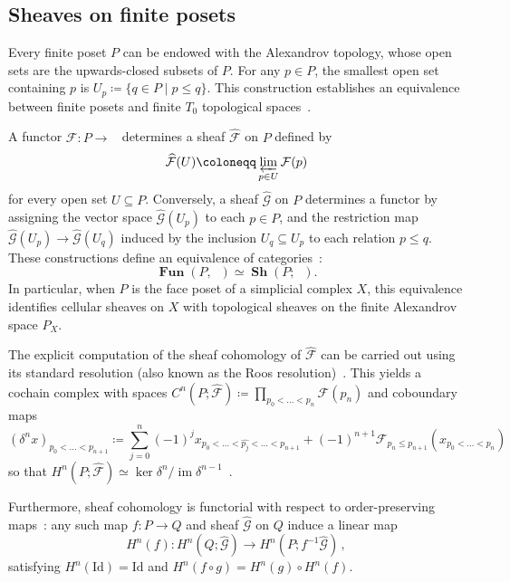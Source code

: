 \documentclass[reqno,12pt]{amsart}
\newcommand{\cF}{{\mathcal F}}
\newcommand{\cG}{{\mathcal G}}
\DeclareMathOperator{\Sh}{\mathbf{Sh}}
\DeclareMathOperator{\Fun}{\mathbf{Fun}}
\DeclareMathOperator{\vect}{\mathbf{vect}_\Bbbk}
\DeclareMathOperator{\img}{im}
\newcommand{\0}{\mathbf 0}
\theoremstyle{definition}
\begin{document}
\subsection{Sheaves on finite posets}
\label{Sec:HacesPosets}
Every finite poset $P$ can be endowed with the Alexandrov topology, whose open sets are the upwards-closed subsets of $P$. For any $p\in P$, the smallest open set containing $p$ is $U_p\coloneqq \{q\in P \mid p\leq q\}$. This construction establishes an equivalence between finite posets and finite $T_0$ topological spaces~\cite{Barmak11}. 

A functor $\cF\colon P\to\vect$ determines a sheaf $\widehat{\cF}$ on $P$ defined by
\[
    \widehat{\cF}(U) \coloneqq \varprojlim_{p\in U}\cF(p)
\]
for every open set $U\subseteq P$. Conversely, a sheaf $\widehat{\cG}$ on $P$ determines a functor by assigning the vector space $\widehat{\cG}(U_p)$ to each $p \in P$, and the restriction map $\widehat{\cG}(U_p) \to \widehat{\cG}(U_q)$ induced by the inclusion $U_q \subseteq U_p$ to each relation $p \leq q$. These constructions define an equivalence of categories~\cite[Theorem~4.2.10]{Curry14}: 
\[
    \Fun(P,\vect)\simeq \Sh(P;\vect).
\]
In particular, when $P$ is the face poset of a simplicial complex $X$, this equivalence identifies cellular sheaves on $X$ with topological sheaves on the finite Alexandrov space $P_X$.

The explicit computation of the sheaf cohomology of $\widehat{\cF}$ can be carried out using its standard resolution (also known as the Roos resolution)~\cite{Fernando_17}. This yields a cochain complex with spaces $C^n(P;\widehat{\mathcal{F}}) \coloneqq \prod_{p_0<\dots<p_n}\mathcal{F}(p_n)$ and coboundary maps 
\begin{equation}\label{Eq:CoboundaryStandardResolution}
    (\delta^n x)_{p_0<\dots<p_{n+1}} \coloneqq \sum_{j=0}^{n} (-1)^j x_{p_0<\dots<\widehat{p_j}<\dots<p_{n+1}} + (-1)^{n+1} \mathcal{F}_{p_n\leq p_{n+1}} (x_{p_0<\dots<p_n})
\end{equation}
so that $H^n(P;\widehat{\cF})\simeq \ker \delta^n/\img\delta^{n-1}$~\cite[Theorem 2.15]{Fernando_17}.

Furthermore, sheaf cohomology is functorial with respect to order-preserving maps~\cite[Section 4.16]{Godement58}: any such map $f\colon P\to Q$ and sheaf $\widehat{\mathcal{G}}$ on $Q$ induce a linear map
\[
H^n(f)\colon H^n(Q;\widehat{\mathcal{G}}) \longrightarrow H^n(P;f^{-1}\widehat{\mathcal{G}})\,,\]
satisfying $H^n(\text{Id}) = \text{Id}$ and $H^n(f\circ g) = H^n(g)\circ H^n(f)$.
\end{document}
